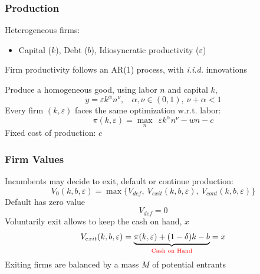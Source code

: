 \documentclass[aspectratio=169,xcolor=table]{beamer}
\begin{document}
\begin{frame}[label=Firms] \frametitle{Production}

Heterogeneous firms: 
\begin{itemize} \small
    \item Capital ($k$), Debt ($b$), Idiosyncratic productivity ($\varepsilon$)
\end{itemize} \normalsize
Firm productivity follows an AR(1) process, with \textit{i.i.d.} innovations \vspace{3mm}

Produce a homogeneous good, using labor $n$ and capital $k$,
$$ y = \varepsilon k^{\alpha}n^{\nu}, \ \ \ \ \alpha,\nu \in (0,1),  \ \nu + \alpha < 1 $$
Every firm $(k,\varepsilon)$ faces the same optimization w.r.t. labor:
$$ \pi(k,\varepsilon) = \max_{n} \ \  \varepsilon k^{\alpha}n^{\nu} - wn - c$$ 
Fixed cost of production: $c$

\end{frame}


\begin{frame}[label=Firmvalues] \frametitle{Firm Values}

Incumbents may decide to exit, default or continue production: 
\begin{equation*} \label{eq:default decision}
    V_0(k,b,\varepsilon) = \max \{V_{def}, \  V_{exit}(k,b,\varepsilon),  \ V_{cont}(k,b,\varepsilon) \}
\end{equation*}
Default has zero value
$$ V_{def} = 0 $$ 
Voluntarily exit allows to keep the cash on hand, $x$ 
 $$    V_{exit}(k, b, \varepsilon) =  \underbrace{\pi(k,\varepsilon) + (1-\delta)k - b}_{\textcolor{red}{\text{Cash on Hand}}}  = x $$
Exiting firms are balanced by a mass $M$ of potential entrants \hfill \hyperlink{Entrants}{}
\end{frame}
\end{document}
